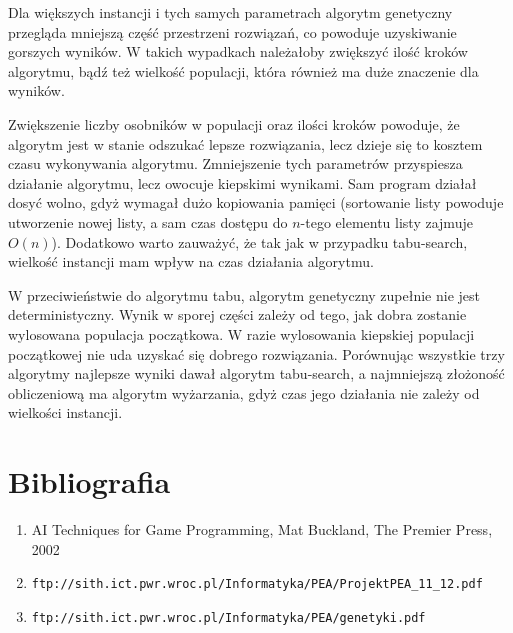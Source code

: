   Dla większych instancji i tych samych parametrach algorytm genetyczny
  przegląda mniejszą część przestrzeni rozwiązań, co powoduje uzyskiwanie
  gorszych wyników. W takich wypadkach należałoby zwiększyć ilość kroków
  algorytmu, bądź też wielkość populacji, która również ma duże znaczenie dla
  wyników.
  \vspace{1em}

  Zwiększenie liczby osobników w populacji oraz ilości kroków powoduje, że
  algorytm jest w stanie odszukać lepsze rozwiązania, lecz dzieje się to kosztem
  czasu wykonywania algorytmu. Zmniejszenie tych parametrów przyspiesza
  działanie algorytmu, lecz owocuje kiepskimi wynikami. Sam program działał
  dosyć wolno, gdyż wymagał dużo kopiowania pamięci (sortowanie listy powoduje
  utworzenie nowej listy, a sam czas dostępu do $n$-tego elementu listy zajmuje
  $O(n)$). Dodatkowo warto zauważyć, że tak jak w przypadku tabu-search,
  wielkość instancji mam wpływ na czas działania algorytmu.
  \vspace{1em}

  W przeciwieństwie do algorytmu tabu, algorytm genetyczny zupełnie nie jest
  deterministyczny. Wynik w sporej części zależy od tego, jak dobra zostanie
  wylosowana populacja początkowa. W razie wylosowania kiepskiej populacji
  początkowej nie uda uzyskać się dobrego rozwiązania. Porównując wszystkie trzy
  algorytmy najlepsze wyniki dawał algorytm tabu-search, a najmniejszą złożoność
  obliczeniową ma algorytm wyżarzania, gdyż czas jego działania nie zależy od
  wielkości instancji.


\appendix
\section{Bibliografia} %
  \label{sec:biblio}
  \begin{enumerate}
    \item AI Techniques for Game Programming, Mat Buckland, The Premier Press, 2002
    \item \texttt{ftp://sith.ict.pwr.wroc.pl/Informatyka/PEA/ProjektPEA\_11\_12.pdf}
    \item \texttt{ftp://sith.ict.pwr.wroc.pl/Informatyka/PEA/genetyki.pdf}
  \end{enumerate}


